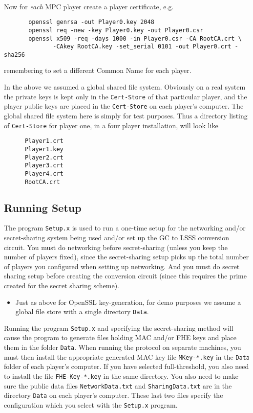~~

\noindent
Now for {\em each} MPC player create a player certificate, e.g.
\begin{verbatim}
       openssl genrsa -out Player0.key 2048
       openssl req -new -key Player0.key -out Player0.csr
       openssl x509 -req -days 1000 -in Player0.csr -CA RootCA.crt \
              -CAkey RootCA.key -set_serial 0101 -out Player0.crt -sha256
\end{verbatim}
remembering to set a different Common Name for each player.

In the above we assumed a global shared file system.  Obviously on
a real system the private keys is kept only in the
\verb+Cert-Store+ of that particular player, and the player public
keys are placed in the \verb+Cert-Store+ on each player's
computer. The global shared file system here is simply for test
purposes. Thus a directory listing of \verb+Cert-Store+
for player one, in a four player installation, will look like
\begin{verbatim}
      Player1.crt
      Player1.key
      Player2.crt
      Player3.crt
      Player4.crt
      RootCA.crt
\end{verbatim}


\subsection{Running Setup}\label{subsec:setup}
The program \verb+Setup.x+ is used to run a one-time setup
for the networking and/or secret-sharing system being used
and/or set up the GC to LSSS conversion circuit.
You must do networking before secret-sharing (unless you keep
the number of players fixed), since the secret-sharing setup
picks up the total number of players you configured when setting
up networking.
And you must do secret sharing setup before creating the conversion
circuit (since this requires the prime created for the secret
sharing scheme).
\begin{itemize}
\item Just as above for OpenSSL key-generation, for demo purposes we assume
a global file store with a single directory \verb+Data+.
\end{itemize}
Running the program \verb+Setup.x+ and specifying the secret-sharing
method will cause the program to generate files holding MAC and/or FHE
keys and place them in the folder \verb+Data+.  When running the
protocol on separate machines, you must then install the appropriate
generated MAC key file \verb+MKey-*.key+ in the \verb+Data+ folder of
each player's computer.  If you have selected full-threshold, you also
need to install the file \verb+FHE-Key-*.key+ in the same directory.
You also need to make sure the public data files
\verb+NetworkData.txt+ and \verb+SharingData.txt+ are in the directory
\verb+Data+ on each player's computer.
These last two files specify the configuration which you select with
the \verb+Setup.x+ program.

